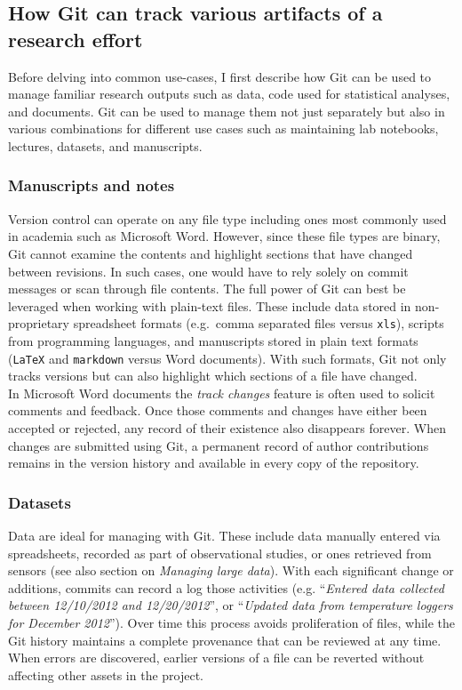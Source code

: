 \documentclass[]{article}
\begin{document}
\subsection{How Git can track various artifacts of a research effort}

Before delving into common use-cases, I first describe how Git can be
used to manage familiar research outputs such as data, code used for
statistical analyses, and documents. Git can be used to manage them not
just separately but also in various combinations for different use cases
such as maintaining lab notebooks, lectures, datasets, and manuscripts.

\subsubsection{Manuscripts and notes}

Version control can operate on any file type including ones most
commonly used in academia such as Microsoft Word. However, since these
file types are binary, Git cannot examine the contents and highlight
sections that have changed between revisions. In such cases, one would
have to rely solely on commit messages or scan through file contents.
The full power of Git can best be leveraged when working with plain-text
files. These include data stored in non-proprietary spreadsheet formats
(e.g.~comma separated files versus \texttt{xls}), scripts from
programming languages, and manuscripts stored in plain text formats
(\texttt{LaTeX} and \texttt{markdown} versus Word documents). With such
formats, Git not only tracks versions but can also highlight which
sections of a file have changed.\\In Microsoft Word documents the
\emph{track changes} feature is often used to solicit comments and
feedback. Once those comments and changes have either been accepted or
rejected, any record of their existence also disappears forever. When
changes are submitted using Git, a permanent record of author
contributions remains in the version history and available in every copy
of the repository.

\subsubsection{Datasets}

Data are ideal for managing with Git. These include data manually
entered via spreadsheets, recorded as part of observational studies, or
ones retrieved from sensors (see also section on \emph{Managing large
data}). With each significant change or additions, commits can record a
log those activities (e.g. ``\emph{Entered data collected between
12/10/2012 and 12/20/2012}'', or ``\emph{Updated data from temperature
loggers for December 2012}''). Over time this process avoids
proliferation of files, while the Git history maintains a complete
provenance that can be reviewed at any time. When errors are discovered,
earlier versions of a file can be reverted without affecting other
assets in the project.
\end{document}
